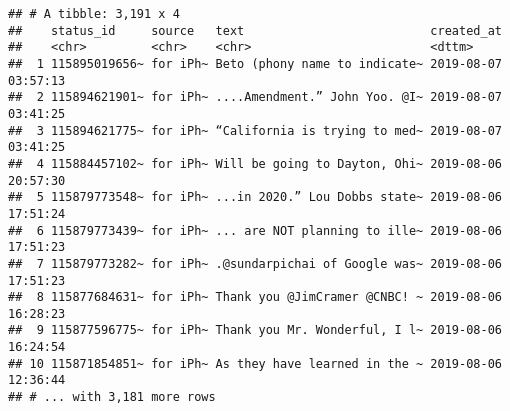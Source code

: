 \documentclass[]{article}
\begin{document}
\begin{verbatim}
## # A tibble: 3,191 x 4
##    status_id     source   text                          created_at         
##    <chr>         <chr>    <chr>                         <dttm>             
##  1 115895019656~ for iPh~ Beto (phony name to indicate~ 2019-08-07 03:57:13
##  2 115894621901~ for iPh~ ....Amendment.” John Yoo. @I~ 2019-08-07 03:41:25
##  3 115894621775~ for iPh~ “California is trying to med~ 2019-08-07 03:41:25
##  4 115884457102~ for iPh~ Will be going to Dayton, Ohi~ 2019-08-06 20:57:30
##  5 115879773548~ for iPh~ ...in 2020.” Lou Dobbs state~ 2019-08-06 17:51:24
##  6 115879773439~ for iPh~ ... are NOT planning to ille~ 2019-08-06 17:51:23
##  7 115879773282~ for iPh~ .@sundarpichai of Google was~ 2019-08-06 17:51:23
##  8 115877684631~ for iPh~ Thank you @JimCramer @CNBC! ~ 2019-08-06 16:28:23
##  9 115877596775~ for iPh~ Thank you Mr. Wonderful, I l~ 2019-08-06 16:24:54
## 10 115871854851~ for iPh~ As they have learned in the ~ 2019-08-06 12:36:44
## # ... with 3,181 more rows
\end{verbatim}
\end{document}
